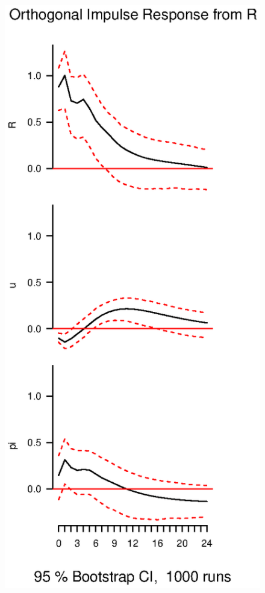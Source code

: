 \documentclass{beamer}
\begin{document}
\begin{frame}
  \begin{figure}
    \includegraphics[scale=.5]{interest_shock2.eps}
  \end{figure}
\end{frame}
\end{document}
